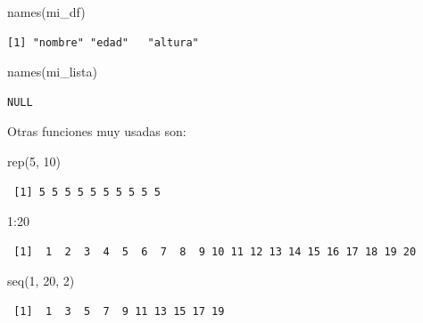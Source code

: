 \documentclass[
  letterpaper,
  DIV=11,
  numbers=noendperiod]{scrartcl}
\newenvironment{Shaded}{\begin{snugshade}}{\end{snugshade}}
\newcommand{\DecValTok}[1]{\textcolor[rgb]{0.68,0.00,0.00}{#1}}
\newcommand{\FunctionTok}[1]{\textcolor[rgb]{0.28,0.35,0.67}{#1}}
\newcommand{\NormalTok}[1]{\textcolor[rgb]{0.00,0.23,0.31}{#1}}
\newcommand{\SpecialCharTok}[1]{\textcolor[rgb]{0.37,0.37,0.37}{#1}}
\begin{document}
\begin{Shaded}
\begin{Highlighting}[]
\FunctionTok{names}\NormalTok{(mi\_df) }
\end{Highlighting}
\end{Shaded}

\begin{verbatim}
[1] "nombre" "edad"   "altura"
\end{verbatim}

\begin{Shaded}
\begin{Highlighting}[]
\FunctionTok{names}\NormalTok{(mi\_lista)}
\end{Highlighting}
\end{Shaded}

\begin{verbatim}
NULL
\end{verbatim}

Otras funciones muy usadas son:

\begin{Shaded}
\begin{Highlighting}[]
\FunctionTok{rep}\NormalTok{(}\DecValTok{5}\NormalTok{, }\DecValTok{10}\NormalTok{)  }
\end{Highlighting}
\end{Shaded}

\begin{verbatim}
 [1] 5 5 5 5 5 5 5 5 5 5
\end{verbatim}

\begin{Shaded}
\begin{Highlighting}[]
\DecValTok{1}\SpecialCharTok{:}\DecValTok{20} 
\end{Highlighting}
\end{Shaded}

\begin{verbatim}
 [1]  1  2  3  4  5  6  7  8  9 10 11 12 13 14 15 16 17 18 19 20
\end{verbatim}

\begin{Shaded}
\begin{Highlighting}[]
\FunctionTok{seq}\NormalTok{(}\DecValTok{1}\NormalTok{, }\DecValTok{20}\NormalTok{, }\DecValTok{2}\NormalTok{) }
\end{Highlighting}
\end{Shaded}

\begin{verbatim}
 [1]  1  3  5  7  9 11 13 15 17 19
\end{verbatim}
\end{document}

